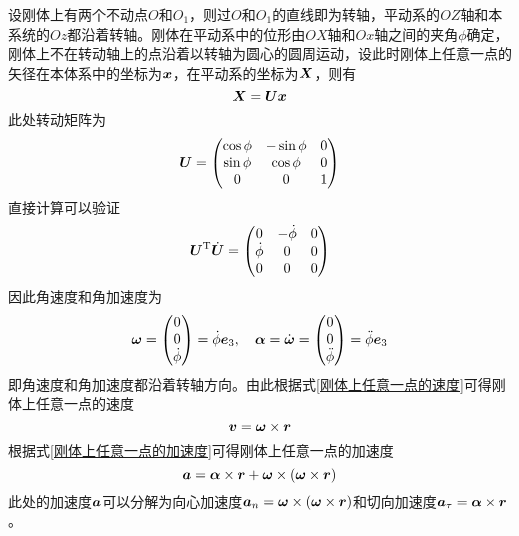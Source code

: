 设刚体上有两个不动点$O$和$O_1$，则过$O$和$O_1$的直线即为转轴，平动系的$OZ$轴和本系统的$Oz$都沿着转轴。刚体在平动系中的位形由$OX$轴和$Ox$轴之间的夹角$\phi$确定，刚体上不在转动轴上的点沿着以转轴为圆心的圆周运动，设此时刚体上任意一点的矢径在本体系中的坐标为$\boldsymbol{x}$，在平动系的坐标为$\boldsymbol{X}$，则有
\begin{equation*}
	\boldsymbol{X} = \boldsymbol{U} \boldsymbol{x}
\end{equation*}
此处转动矩阵为
\begin{equation}
	\boldsymbol{U} = \begin{pmatrix} \cos \phi & -\sin \phi & 0 \\ \sin \phi & \cos \phi & 0 \\ 0 & 0 & 1 \end{pmatrix}
	\label{定轴转动的转动矩阵}
\end{equation}
直接计算可以验证
\begin{equation*}
	\boldsymbol{U}^{\mathrm{T}} \dot{\boldsymbol{U}} = \begin{pmatrix} 0 & -\dot{\phi} & 0 \\ \dot{\phi} & 0 & 0 \\ 0 & 0 & 0 \end{pmatrix}
\end{equation*}
因此角速度和角加速度为
\begin{equation*}
	\boldsymbol{\omega} = \begin{pmatrix} 0 \\ 0 \\ \dot{\phi} \end{pmatrix} = \dot{\phi} \boldsymbol{e}_3,\quad \boldsymbol{\alpha} = \dot{\boldsymbol{\omega}} = \begin{pmatrix} 0 \\ 0 \\ \ddot{\phi} \end{pmatrix} = \ddot{\phi} \boldsymbol{e}_3
\end{equation*}
即角速度和角加速度都沿着转轴方向。由此根据式\eqref{刚体上任意一点的速度}可得刚体上任意一点的速度
\begin{equation*}
	\boldsymbol{v} = \boldsymbol{\omega} \times \boldsymbol{r}
\end{equation*}
根据式\eqref{刚体上任意一点的加速度}可得刚体上任意一点的加速度
\begin{equation*}
	\boldsymbol{a} = \boldsymbol{\alpha} \times \boldsymbol{r} + \boldsymbol{\omega} \times (\boldsymbol{\omega} \times \boldsymbol{r})
\end{equation*}
此处的加速度$\boldsymbol{a}$可以分解为向心加速度$\boldsymbol{a}_n = \boldsymbol{\omega} \times (\boldsymbol{\omega} \times \boldsymbol{r})$和切向加速度$\boldsymbol{a}_\tau = \boldsymbol{\alpha} \times \boldsymbol{r}$。

